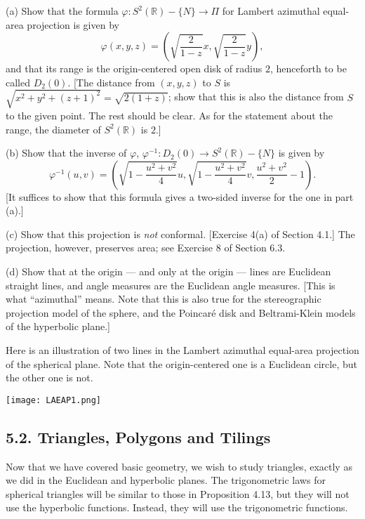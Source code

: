 \documentclass[leqno]{book}
\begin{document}
\begin{enumerate}
(a) Show that the formula $\varphi:S^2(\mathbb R)-\{N\}\to\Pi$ for Lambert azimuthal equal-area projection is given by
$$\varphi(x,y,z)=\left(\sqrt{\frac 2{1-z}}x,\sqrt{\frac 2{1-z}}y\right),$$
and that its range is the origin-centered open disk of radius $2$, henceforth to be called $D_2(0)$.  [The distance from $(x,y,z)$ to $S$ is $\sqrt{x^2+y^2+(z+1)^2}=\sqrt{2(1+z)}$; show that this is also the distance from $S$ to the given point.  The rest should be clear.  As for the statement about the range, the diameter of $S^2(\mathbb R)$ is $2$.]

(b) Show that the inverse of $\varphi$, $\varphi^{-1}:D_2(0)\to S^2(\mathbb R)-\{N\}$ is given by
$$\varphi^{-1}(u,v)=\left(\sqrt{1-\frac{u^2+v^2}4}u,\sqrt{1-\frac{u^2+v^2}4}v,\frac{u^2+v^2}2-1\right).$$
[It suffices to show that this formula gives a two-sided inverse for the one in part (a).]

(c) Show that this projection is \emph{not} conformal.  [Exercise 4(a) of Section 4.1.]  The projection, however, preserves area; see Exercise 8 of Section 6.3.

(d) Show that at the origin \---- and only at the origin \---- lines are Euclidean straight lines, and angle measures are the Euclidean angle measures.  [This is what ``azimuthal'' means.  Note that this is also true for the stereographic projection model of the sphere, and the Poincar\'e disk and Beltrami-Klein models of the hyperbolic plane.]

Here is an illustration of two lines in the Lambert azimuthal equal-area projection of the spherical plane.  Note that the origin-centered one is a Euclidean circle, but the other one is not.
\begin{center}
\texttt{[image: LAEAP1.png]}
\end{center}
\end{enumerate}

\subsection*{5.2. Triangles, Polygons and Tilings}
Now that we have covered basic geometry, we wish to study triangles, exactly as we did in the Euclidean and hyperbolic planes.  The trigonometric laws for spherical triangles will be similar to those in Proposition 4.13, but they will not use the hyperbolic functions.  Instead, they will use the trigonometric functions.
\end{document}

